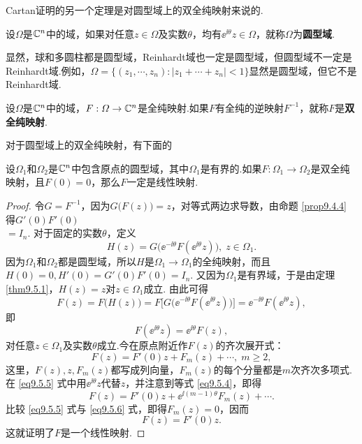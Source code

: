 Cartan证明的另一个定理是对圆型域上的双全纯映射来说的.
\begin{definition}\label{def9.5.2}
设$\Omega$是$\mathbb C^n$中的域，如果对任意$z\in\Omega$及实数$\theta$，均有$\ee^{\ii\theta}z\in\Omega$，就称$\Omega$为\textbf{圆型域}.
\end{definition}

显然，球和多圆柱都是圆型域，Reinhardt域也一定是圆型域，但圆型域不一定是Reinhardt域.例如，$\Omega=\{(z_1,\cdots,z_n):|z_1+\cdots+z_n|<1\}$显然是圆型域，但它不是Reinhardt域.
\begin{definition}\label{def9.5.3}
设$\Omega$是$\mathbb C^n$中的域，$F:\varOmega\to\mathbb C^n$是全纯映射.如果$F$有全纯的逆映射$F^{-1}$，就称$F$是\textbf{双全纯映射}.
\end{definition}

对于圆型域上的双全纯映射，有下面的
\begin{theorem}\label{thm9.5.4}
设$\Omega_1$和$\Omega_2$是$\mathbb C^n$中包含原点的圆型域，其中$\Omega_1$是有界的.如果$F:\Omega_1\to\Omega_2$是双全纯映射，且$F(0)=0$，那么$F$一定是线性映射.
\end{theorem}
\begin{proof}
令$G=F^{-1}$，因为$G\big(F(z)\big)=z$，对等式两边求导数，由命题 \ref{prop9.4.4} 得$G'(0)F'(0)$\\$= I_n$. 对于固定的实数$\theta$，定义
\[H(z)=G\big(\ee^{-\ii\theta}F(\ee^{\ii\theta}z)\big),\;z\in\Omega_1.\]
因为$\Omega_1$和$\Omega_2$都是圆型域，所以$H$是$\Omega_1\to\Omega_1$的全纯映射，而且
$H(0)=0,H'(0)=G'(0)F'(0)= I_n$. 又因为$\Omega_1$是有界域，于是由定理 \ref{thm9.5.1}，$H(z)=z$对$z\in\Omega_1$成立. 由此可得
\[F(z)=F\big(H(z)\big)=F\big[G\big(\ee^{-\ii\theta}F(\ee^{\ii\theta}z)\big)\big]
=\ee^{-\ii\theta}F(\ee^{\ii\theta}z),\]
即
\begin{equation}\label{eq9.5.4}
F(\ee^{\ii\theta}z)=\ee^{\ii\theta}F(z),
\end{equation}
对任意$z\in\Omega_1$及实数$\theta$成立.今在原点附近作$F(z)$的齐次展开式：
\begin{equation}\label{eq9.5.5}
F(z)=F'(0)z+F_m(z)+\cdots,\;m\ge2,
\end{equation}
这里，$F(z),z,F_m(z)$都写成列向量，$F_m(z)$的每个分量都是$m$次齐次多项式.在 \eqref{eq9.5.5} 式中用$\ee^{\ii\theta}z$代替$z$，并注意到等式 \eqref{eq9.5.4}，即得
\begin{equation}\label{eq9.5.6}
F(z)=F'(0)z+\ee^{\ii(m-1)\theta}F_m(z)+\cdots.
\end{equation}
比较 \eqref{eq9.5.5} 式与 \eqref{eq9.5.6} 式，即得$F_m(z)=0$，因而
\[F(z)=F'(0)z.\]
这就证明了$F$是一个线性映射.
\end{proof}

